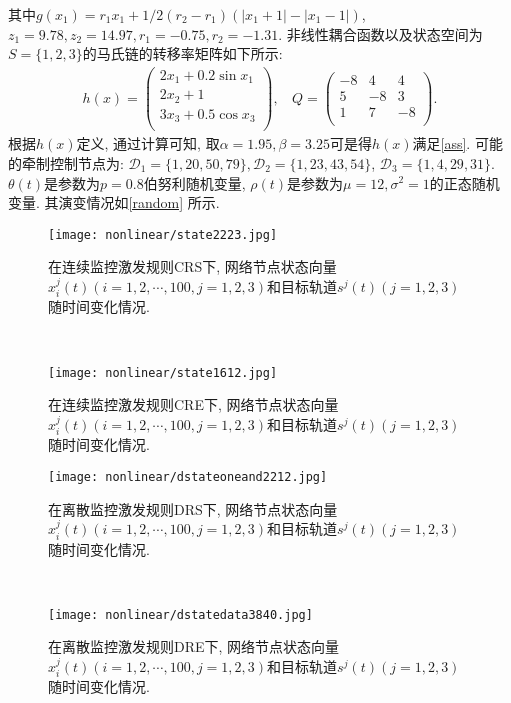         其中$g(x_1)=r_1x_1+1/2(r_2-r_1)(|x_1+1|-|x_1-1|)$, $z_1=9.78,z_2=14.97,r_1=-0.75,r_2=-1.31$.
        非线性耦合函数以及状态空间为$S=\{1,2,3\}$的马氏链的转移率矩阵如下所示:
           \begin{align*}
           h(x)=\left(
                  \begin{array}{c}
                    2x_1+0.2\sin x_1 \\
                    2x_2+1 \\
                    3x_3+0.5\cos x_3 \\
                  \end{array}
                \right),~~~~
           Q=\left(
            \begin{array}{ccc}
              -8 & 4 & 4 \\
              5 & -8 & 3 \\
              1 & 7 & -8 \\
            \end{array}
          \right).
           \end{align*}
        根据$h(x)$定义, 通过计算可知, 取$\alpha=1.95, \beta=3.25$可是得$h(x)$满足\autoref{ass}. 可能的牵制控制节点为: $\mathcal{D}_1=\{1,20,50,79\}, \mathcal{D}_2=\{1,23,43,54\}$, $\mathcal{D}_3=\{1,4,29,31\}$.
        $\theta(t)$是参数为$p=0.8$伯努利随机变量, $\rho(t)$是参数为$\mu=12,\sigma^2=1$的正态随机变量. 其演变情况如\autoref{random} 所示.
\begin{figure}[!htb]
\begin{minipage}[t]{0.48\linewidth}
\centering
\texttt{[image: nonlinear/state2223.jpg]}
\caption{在连续监控激发规则CRS下, 网络节点状态向量$x^j_i(t)(i=1,2,\cdots,100,j=1,2,3)$和目标轨道$s^j(t)(j=1,2,3)$随时间变化情况.}\label{numcrule1}
\end{minipage}~~
\begin{minipage}[t]{0.48\linewidth}
\centering
\texttt{[image: nonlinear/state1612.jpg]}
\caption{在连续监控激发规则CRE下, 网络节点状态向量$x^j_i(t)(i=1,2,\cdots,100,j=1,2,3)$和目标轨道$s^j(t)(j=1,2,3)$随时间变化情况.}\label{numcrule2}
\end{minipage}
\end{figure}

\begin{figure}[!htb]
\begin{minipage}[t]{0.48\linewidth}
\centering
\texttt{[image: nonlinear/dstateoneand2212.jpg]}
\caption{在离散监控激发规则DRS下, 网络节点状态向量$x^j_i(t)(i=1,2,\cdots,100,j=1,2,3)$和目标轨道$s^j(t)(j=1,2,3)$随时间变化情况.}\label{numdrule1}
\end{minipage}~~
\begin{minipage}[t]{0.48\linewidth}
\centering
\texttt{[image: nonlinear/dstatedata3840.jpg]}
\caption{在离散监控激发规则DRE下, 网络节点状态向量$x^j_i(t)(i=1,2,\cdots,100,j=1,2,3)$和目标轨道$s^j(t)(j=1,2,3)$随时间变化情况.}\label{numdrule2}
\end{minipage}
\end{figure}

